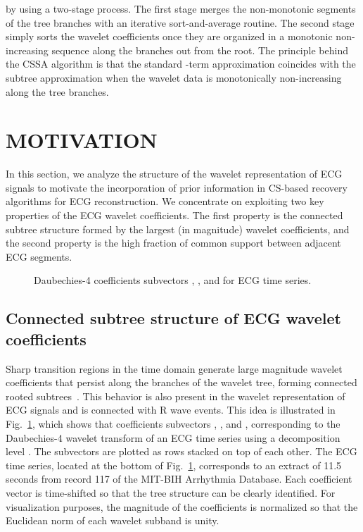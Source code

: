 \documentclass[journal]{IEEEtran}
\begin{document}
by using a two-stage process. The first stage merges the non-monotonic segments of the tree branches with an iterative sort-and-average routine. The second stage simply sorts the wavelet coefficients once they are organized in a monotonic non-increasing sequence along the branches out from the root. The principle behind the CSSA algorithm is that the standard -term approximation coincides with the subtree approximation when the wavelet data is monotonically non-increasing along the tree branches.


\section{MOTIVATION}
In this section, we analyze the structure of the wavelet representation of ECG signals to motivate the incorporation of prior information in CS-based recovery algorithms for ECG reconstruction. We concentrate on exploiting two key properties of the ECG wavelet coefficients. The first property is the connected subtree structure formed by the largest (in magnitude) wavelet coefficients, and the second property is the high fraction of common support between adjacent ECG segments.
\label{ssec:CSPKS}
\begin{figure}[t]
\caption{Daubechies-4 coefficients subvectors , , and  for ECG time series. } \label{fig:stack}
\end{figure}

\subsection{Connected subtree structure of ECG wavelet coefficients}
Sharp transition regions in the time domain generate large magnitude wavelet coefficients that persist along the branches of the wavelet tree, forming connected rooted subtrees~\cite{Crou98}. This behavior is also present in the wavelet representation of ECG signals and is connected with R wave events. This idea is illustrated in Fig.~\ref{fig:stack}, which shows that coefficients subvectors , , and , corresponding to the Daubechies-4 wavelet transform of an ECG time series using a decomposition level . The subvectors are plotted as rows stacked on top of each other. The ECG time series, located at the bottom of Fig.~\ref{fig:stack}, corresponds to an extract of 11.5 seconds from record 117 of the MIT-BIH Arrhythmia Database. Each coefficient vector is time-shifted so that the tree structure can be clearly identified. For visualization purposes, the magnitude of the coefficients is normalized so that the Euclidean norm of each wavelet subband is unity.
\end{document}
